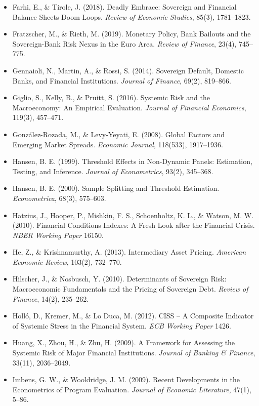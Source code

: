 \documentclass[5p,times,twocolumn,authoryear]{elsarticle}
\begin{document}
\begin{itemize}
    \item Farhi, E., \& Tirole, J. (2018). Deadly Embrace: Sovereign and Financial Balance Sheets Doom Loops. \textit{Review of Economic Studies}, 85(3), 1781–1823.
    \item Fratzscher, M., \& Rieth, M. (2019). Monetary Policy, Bank Bailouts and the Sovereign-Bank Risk Nexus in the Euro Area. \textit{Review of Finance}, 23(4), 745–775.
    \item Gennaioli, N., Martin, A., \& Rossi, S. (2014). Sovereign Default, Domestic Banks, and Financial Institutions. \textit{Journal of Finance}, 69(2), 819–866.
    \item Giglio, S., Kelly, B., \& Pruitt, S. (2016). Systemic Risk and the Macroeconomy: An Empirical Evaluation. \textit{Journal of Financial Economics}, 119(3), 457–471.
    \item González-Rozada, M., \& Levy-Yeyati, E. (2008). Global Factors and Emerging Market Spreads. \textit{Economic Journal}, 118(533), 1917–1936.
    \item Hansen, B. E. (1999). Threshold Effects in Non-Dynamic Panels: Estimation, Testing, and Inference. \textit{Journal of Econometrics}, 93(2), 345–368.
    \item Hansen, B. E. (2000). Sample Splitting and Threshold Estimation. \textit{Econometrica}, 68(3), 575–603.
    \item Hatzius, J., Hooper, P., Mishkin, F. S., Schoenholtz, K. L., \& Watson, M. W. (2010). Financial Conditions Indexes: A Fresh Look after the Financial Crisis. \textit{NBER Working Paper} 16150.
    \item He, Z., \& Krishnamurthy, A. (2013). Intermediary Asset Pricing. \textit{American Economic Review}, 103(2), 732–770.
    \item Hilscher, J., \& Nosbusch, Y. (2010). Determinants of Sovereign Risk: Macroeconomic Fundamentals and the Pricing of Sovereign Debt. \textit{Review of Finance}, 14(2), 235–262.
    \item Holló, D., Kremer, M., \& Lo Duca, M. (2012). CISS – A Composite Indicator of Systemic Stress in the Financial System. \textit{ECB Working Paper} 1426.
    \item Huang, X., Zhou, H., \& Zhu, H. (2009). A Framework for Assessing the Systemic Risk of Major Financial Institutions. \textit{Journal of Banking \& Finance}, 33(11), 2036–2049.
    \item Imbens, G. W., \& Wooldridge, J. M. (2009). Recent Developments in the Econometrics of Program Evaluation. \textit{Journal of Economic Literature}, 47(1), 5–86.

\end{itemize}
\end{document}

